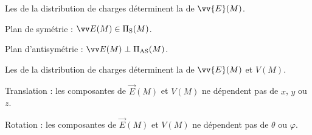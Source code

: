 \documentclass[12pt,fancy]{cours}
\begin{document}
\begin{methode}
  \item Les  de la distribution de charges déterminent la  de $\vv{E}(M)$.
  \begin{liste}
    \item Plan de symétrie : $\Vec{E}(M) \in \Pi_{\rm S}(M)$.
    \item Plan d'antisymétrie : $\Vec{E}(M) \perp \Pi_{\rm AS}(M)$.
  \end{liste}
  \item	Les  de la distribution de charges déterminent la  de $\vv{E}(M)$ et $V(M)$.
   \begin{liste}
    \item Translation :  les composantes de  $\Vec{E}(M)$ et $V(M)$ ne dépendent pas de $x$, $y$ ou $z$.
    \item Rotation : les composantes de $\Vec{E}(M)$ et $V(M)$ ne dépendent pas de $\theta$ ou $\varphi$. 
  \end{liste}
\end{methode}


%
\end{document}

